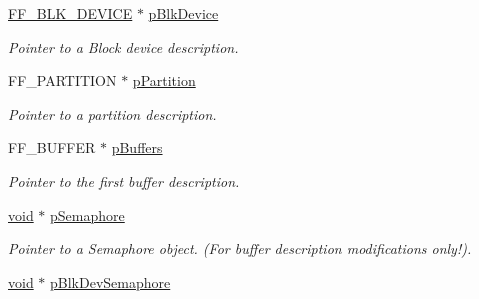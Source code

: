 \begin{DoxyCompactItemize}
\item 
\mbox{\label{struct_f_f___i_o_m_a_n_a1c396db72149a4ccfc8c2e4ad5a1459c}} 
\hyperlink{struct_f_f___b_l_k___d_e_v_i_c_e}{F\+F\+\_\+\+B\+L\+K\+\_\+\+D\+E\+V\+I\+CE} $\ast$ \hyperlink{struct_f_f___i_o_m_a_n_a1c396db72149a4ccfc8c2e4ad5a1459c}{p\+Blk\+Device}
\begin{DoxyCompactList}\small\item\em Pointer to a Block device description. \end{DoxyCompactList}\item 
\mbox{\label{struct_f_f___i_o_m_a_n_a2cd1d983c47ad30787c5099814c0a571}} 
F\+F\+\_\+\+P\+A\+R\+T\+I\+T\+I\+ON $\ast$ \hyperlink{struct_f_f___i_o_m_a_n_a2cd1d983c47ad30787c5099814c0a571}{p\+Partition}
\begin{DoxyCompactList}\small\item\em Pointer to a partition description. \end{DoxyCompactList}\item 
\mbox{\label{struct_f_f___i_o_m_a_n_a7225c2232a65441979a8328fe34596d1}} 
F\+F\+\_\+\+B\+U\+F\+F\+ER $\ast$ \hyperlink{struct_f_f___i_o_m_a_n_a7225c2232a65441979a8328fe34596d1}{p\+Buffers}
\begin{DoxyCompactList}\small\item\em Pointer to the first buffer description. \end{DoxyCompactList}\item 
\mbox{\label{struct_f_f___i_o_m_a_n_a2beb60745c406469ec2729bb52e02c97}} 
\hyperlink{interfacevoid}{void} $\ast$ \hyperlink{struct_f_f___i_o_m_a_n_a2beb60745c406469ec2729bb52e02c97}{p\+Semaphore}
\begin{DoxyCompactList}\small\item\em Pointer to a Semaphore object. (For buffer description modifications only!). \end{DoxyCompactList}\item 
\mbox{\label{struct_f_f___i_o_m_a_n_aebf39f62fcd33e834bb3bb9383a08a2b}} 
\hyperlink{interfacevoid}{void} $\ast$ \hyperlink{struct_f_f___i_o_m_a_n_aebf39f62fcd33e834bb3bb9383a08a2b}{p\+Blk\+Dev\+Semaphore}

\end{DoxyCompactItemize}
